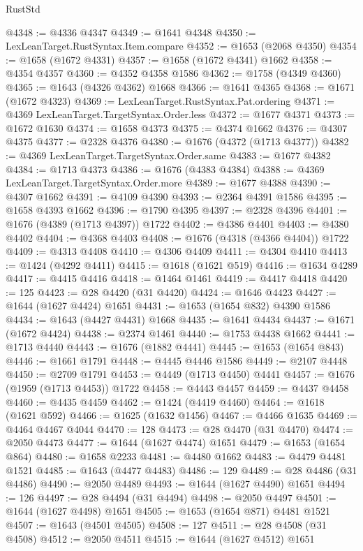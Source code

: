 \begin{lexlean}{RustStd}
\begin{coremodule}
@4348 := @4336 @4347
@4349 := @1641 @4348
@4350 := LexLeanTarget.RustSyntax.Item.compare
@4352 := @1653 (@2068 @4350)
@4354 := @1658 (@1672 @4331)
@4357 := @1658 (@1672 @4341) @1662
@4358 := @4354 @4357
@4360 := @4352 @4358 @1586
@4362 := @1758 (@4349 @4360)
@4365 := @1643 (@4326 @4362) @1668
@4366 := @1641 @4365
@4368 := @1671 (@1672 @4323)
@4369 := LexLeanTarget.RustSyntax.Pat.ordering
@4371 := @4369 LexLeanTarget.TargetSyntax.Order.less
@4372 := @1677 @4371
@4373 := @1672 @1630
@4374 := @1658 @4373
@4375 := @4374 @1662
@4376 := @4307 @4375
@4377 := @2328 @4376
@4380 := @1676 (@4372 (@1713 @4377))
@4382 := @4369 LexLeanTarget.TargetSyntax.Order.same
@4383 := @1677 @4382
@4384 := @1713 @4373
@4386 := @1676 (@4383 @4384)
@4388 := @4369 LexLeanTarget.TargetSyntax.Order.more
@4389 := @1677 @4388
@4390 := @4307 @1662
@4391 := @4109 @4390
@4393 := @2364 @4391 @1586
@4395 := @1658 @4393 @1662
@4396 := @1790 @4395
@4397 := @2328 @4396
@4401 := @1676 (@4389 (@1713 @4397)) @1722
@4402 := @4386 @4401
@4403 := @4380 @4402
@4404 := @4368 @4403
@4408 := @1676 (@4318 (@4366 @4404)) @1722
@4409 := @4313 @4408
@4410 := @4306 @4409
@4411 := @4304 @4410
@4413 := @1424 (@4292 @4411)
@4415 := @1618 (@1621 @519)
@4416 := @1634 @4289
@4417 := @4415 @4416
@4418 := @1464 @1461
@4419 := @4417 @4418
@4420 := 125
@4423 := @28 @4420 (@31 @4420)
@4424 := @1646 @4423
@4427 := @1644 (@1627 @4424) @1651
@4431 := @1653 (@1654 @832) @4390 @1586
@4434 := @1643 (@4427 @4431) @1668
@4435 := @1641 @4434
@4437 := @1671 (@1672 @4424)
@4438 := @2374 @1461
@4440 := @1753 @4438 @1662
@4441 := @1713 @4440
@4443 := @1676 (@1882 @4441)
@4445 := @1653 (@1654 @843)
@4446 := @1661 @1791
@4448 := @4445 @4446 @1586
@4449 := @2107 @4448
@4450 := @2709 @1791
@4453 := @4449 (@1713 @4450) @4441
@4457 := @1676 (@1959 (@1713 @4453)) @1722
@4458 := @4443 @4457
@4459 := @4437 @4458
@4460 := @4435 @4459
@4462 := @1424 (@4419 @4460)
@4464 := @1618 (@1621 @592)
@4466 := @1625 (@1632 @1456)
@4467 := @4466 @1635
@4469 := @4464 @4467 @4044
@4470 := 128
@4473 := @28 @4470 (@31 @4470)
@4474 := @2050 @4473
@4477 := @1644 (@1627 @4474) @1651
@4479 := @1653 (@1654 @864)
@4480 := @1658 @2233
@4481 := @4480 @1662
@4483 := @4479 @4481 @1521
@4485 := @1643 (@4477 @4483)
@4486 := 129
@4489 := @28 @4486 (@31 @4486)
@4490 := @2050 @4489
@4493 := @1644 (@1627 @4490) @1651
@4494 := 126
@4497 := @28 @4494 (@31 @4494)
@4498 := @2050 @4497
@4501 := @1644 (@1627 @4498) @1651
@4505 := @1653 (@1654 @871) @4481 @1521
@4507 := @1643 (@4501 @4505)
@4508 := 127
@4511 := @28 @4508 (@31 @4508)
@4512 := @2050 @4511
@4515 := @1644 (@1627 @4512) @1651

\end{coremodule}
\end{lexlean}
